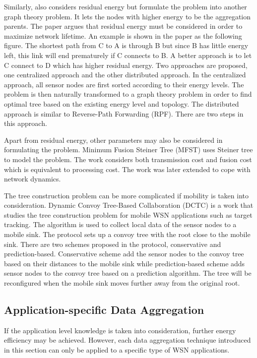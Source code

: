 Similarly, \cite{lpt} also considers residual energy but formulate the problem into another graph theory problem. It lets the nodes with higher energy to be the aggregation parents. The paper argues that residual energy must be considered in order to maximize network lifetime. An example is shown in the paper as the following figure. The shortest path from C to A is through B but since B has little energy left, this link will end prematurely if C connects to B. A better approach is to let C connect to D which has higher residual energy. Two approaches are proposed, one centralized approach and the other distributed approach. In the centralized approach, all sensor nodes are first sorted according to their energy levels. The problem is then naturally transformed to a graph theory problem in order to find optimal tree based on the existing energy level and topology. The distributed approach is similar to Reverse-Path Forwarding (RPF). There are two steps in this approach.

Apart from residual energy, other parameters may also be considered in formulating the problem. Minimum Fusion Steiner Tree (MFST) \cite{mfst} uses Steiner tree to model the problem. The work considers both transmission cost and fusion cost which is equivalent to processing cost. The work was later extended to cope with network dynamics.

The tree construction problem can be more complicated if mobility is taken into consideration. Dynamic Convoy Tree-Based Collaboration (DCTC) \cite{dctc} is a work that studies the tree construction problem for mobile WSN applications such as target tracking. The algorithm is used to collect local data of the sensor nodes to a mobile sink. The protocol sets up a convoy tree with the root close to the mobile sink. There are two schemes proposed in the protocol, conservative and prediction-based. Conservative scheme add the sensor nodes to the convoy tree based on their distances to the mobile sink while prediction-based scheme adds sensor nodes to the convoy tree based on a prediction algorithm. The tree will be reconfigured when the mobile sink moves further away from the original root.

\subsection{Application-specific Data Aggregation}
If the application level knowledge is taken into consideration, further energy efficiency may be achieved. However, each data aggregation technique introduced in this section can only be applied to a specific type of WSN applications. 

